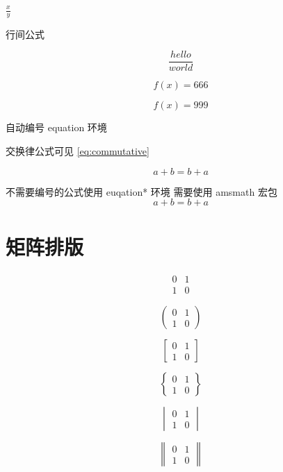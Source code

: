 \documentclass[8pt]{article}
\begin{document}
	$\frac{x}{y}$
	
	行间公式
	
	$$
	\frac{hello}{world}
	$$
	
	\[ f(x) = 666 \]
	
	\begin{displaymath}
		f(x) = 999
	\end{displaymath}
	
	
	自动编号 equation 环境
	
	交换律公式可见 \ref{eq:commutative}
	
	\begin{equation}
		a+b = b+a \label{eq:commutative}
	\end{equation}
	
	
	不需要编号的公式使用 euqation* 环境
	需要使用 amsmath 宏包
	\begin{equation*}
		a+b=b+a
	\end{equation*}
	
	
	
	\section{矩阵排版}
	
	
	
	\[
	\begin{matrix}
		0 & 1 \\
		1 & 0 
	\end{matrix}
	\]
	
		\[
	\begin{pmatrix}
		0 & 1 \\
		1 & 0 
	\end{pmatrix}
	\]
	
	\[
	\begin{bmatrix}
		0 & 1 \\
		1 & 0 
	\end{bmatrix}
	\]
	
	\[
	\begin{Bmatrix}
		0 & 1 \\
		1 & 0 
	\end{Bmatrix}
	\]
	
	\[
	\begin{vmatrix}
		0 & 1 \\
		1 & 0 
	\end{vmatrix}
	\]
	
	\[
	\begin{Vmatrix}
		0 & 1 \\
		1 & 0 
	\end{Vmatrix}
	\]
	
\end{document}
